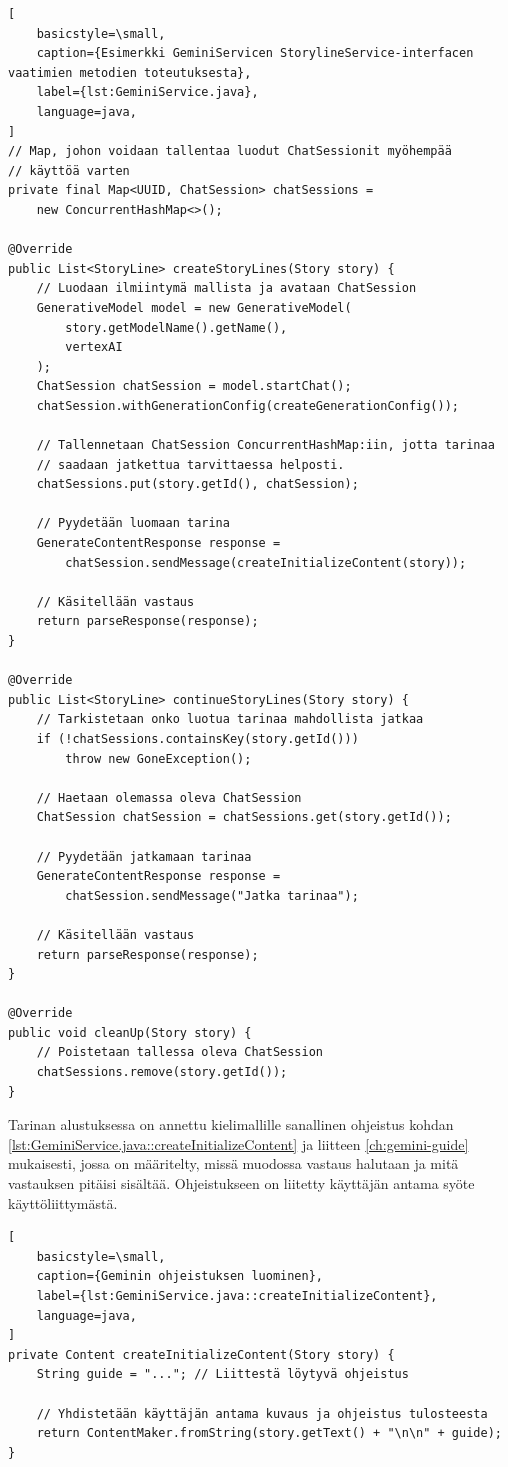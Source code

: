\begin{lstlisting}[
    basicstyle=\small,
    caption={Esimerkki GeminiServicen StorylineService-interfacen vaatimien metodien toteutuksesta},
    label={lst:GeminiService.java},
    language=java,
]
// Map, johon voidaan tallentaa luodut ChatSessionit myöhempää
// käyttöä varten
private final Map<UUID, ChatSession> chatSessions =
    new ConcurrentHashMap<>();

@Override
public List<StoryLine> createStoryLines(Story story) {
    // Luodaan ilmiintymä mallista ja avataan ChatSession
    GenerativeModel model = new GenerativeModel(
        story.getModelName().getName(),
        vertexAI
    );
    ChatSession chatSession = model.startChat();
    chatSession.withGenerationConfig(createGenerationConfig());

    // Tallennetaan ChatSession ConcurrentHashMap:iin, jotta tarinaa
    // saadaan jatkettua tarvittaessa helposti.
    chatSessions.put(story.getId(), chatSession);

    // Pyydetään luomaan tarina
    GenerateContentResponse response =
        chatSession.sendMessage(createInitializeContent(story));

    // Käsitellään vastaus
    return parseResponse(response);
}

@Override
public List<StoryLine> continueStoryLines(Story story) {
    // Tarkistetaan onko luotua tarinaa mahdollista jatkaa
    if (!chatSessions.containsKey(story.getId()))
        throw new GoneException();

    // Haetaan olemassa oleva ChatSession
    ChatSession chatSession = chatSessions.get(story.getId());

    // Pyydetään jatkamaan tarinaa
    GenerateContentResponse response =
        chatSession.sendMessage("Jatka tarinaa");

    // Käsitellään vastaus
    return parseResponse(response);
}

@Override
public void cleanUp(Story story) {
    // Poistetaan tallessa oleva ChatSession
    chatSessions.remove(story.getId());
}
\end{lstlisting}

Tarinan alustuksessa on annettu kielimallille sanallinen ohjeistus kohdan
\ref{lst:GeminiService.java::createInitializeContent} ja liitteen
\ref{ch:gemini-guide} mukaisesti, jossa on määritelty, missä muodossa vastaus
halutaan ja mitä vastauksen pitäisi sisältää. Ohjeistukseen on liitetty
käyttäjän antama syöte käyttöliittymästä.

\begin{lstlisting}[
    basicstyle=\small,
    caption={Geminin ohjeistuksen luominen},
    label={lst:GeminiService.java::createInitializeContent},
    language=java,
]
private Content createInitializeContent(Story story) {
    String guide = "..."; // Liittestä löytyvä ohjeistus

    // Yhdistetään käyttäjän antama kuvaus ja ohjeistus tulosteesta
    return ContentMaker.fromString(story.getText() + "\n\n" + guide);
}
\end{lstlisting}

